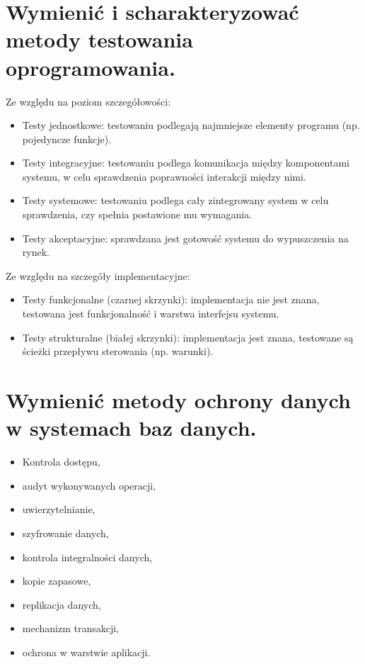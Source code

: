 \documentclass[12pt,a4paper]{article}
\begin{document}
	\section{Wymienić i scharakteryzować metody testowania oprogramowania.}
	Ze względu na poziom szczegółowości:
		\begin{itemize}
			\item Testy jednostkowe: testowaniu podlegają najmniejsze elementy programu (np. pojedyncze funkcje).
			\item Testy integracyjne: testowaniu podlega komunikacja między komponentami systemu, w celu sprawdzenia poprawności interakcji między nimi.
			\item Testy systemowe: testowaniu podlega cały zintegrowany system w celu sprawdzenia, czy spełnia postawione mu wymagania.
			\item Testy akceptacyjne: sprawdzana jest gotowość systemu do wypuszczenia na rynek.
		\end{itemize}
	Ze względu na szczegóły implementacyjne:
		\begin{itemize}
			\item Testy funkcjonalne (czarnej skrzynki): implementacja nie jest znana, testowana jest funkcjonalność i warstwa interfejsu systemu.
			\item Testy strukturalne (białej skrzynki): implementacja jest znana, testowane są ścieżki przepływu sterowania (np. warunki).
		\end{itemize}


	\section{Wymienić metody ochrony danych w systemach baz danych.}
	\begin{multicols}{2}
		\begin{itemize}
			\item Kontrola dostępu,
			\item audyt wykonywanych operacji,
			\item uwierzytelnianie,
			\item szyfrowanie danych,
			\item kontrola integralności danych,
			\item kopie zapasowe,
			\item replikacja danych,
			\item mechanizm transakcji,
			\item ochrona w warstwie aplikacji.
		\end{itemize}
	\end{multicols}
\end{document}
